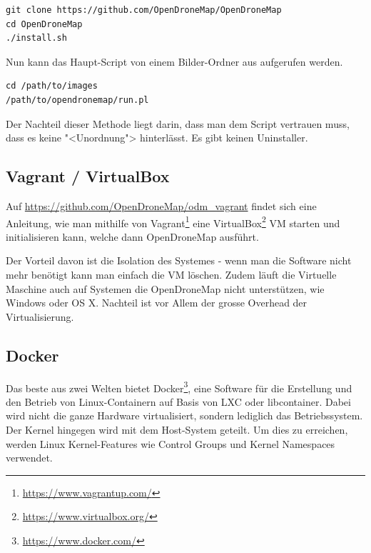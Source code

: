\vspace{0.5\baselineskip}
\begin{verbatim} 
git clone https://github.com/OpenDroneMap/OpenDroneMap
cd OpenDroneMap
./install.sh
\end{verbatim}

\noindent Nun kann das Haupt-Script von einem Bilder-Ordner aus aufgerufen werden.

\vspace{0.5\baselineskip}
\begin{verbatim} 
cd /path/to/images
/path/to/opendronemap/run.pl
\end{verbatim}

\noindent Der Nachteil dieser Methode liegt darin, dass man dem Script vertrauen
muss, dass es keine "<Unordnung"> hinterlässt. Es gibt keinen Uninstaller.

\subsection{Vagrant / VirtualBox}

Auf \url{https://github.com/OpenDroneMap/odm_vagrant} findet sich eine
Anleitung, wie man mithilfe von
Vagrant\footnote{\url{https://www.vagrantup.com/}} eine
VirtualBox\footnote{\url{https://www.virtualbox.org/}} VM starten und
initialisieren kann, welche dann OpenDroneMap ausführt.

Der Vorteil davon ist die Isolation des Systemes - wenn man die Software nicht
mehr benötigt kann man einfach die VM löschen. Zudem läuft die Virtuelle
Maschine auch auf Systemen die OpenDroneMap nicht unterstützen, wie Windows oder
OS X. Nachteil ist vor Allem der grosse Overhead der Virtualisierung.

\subsection{Docker}

Das beste aus zwei Welten bietet Docker\footnote{\url{https://www.docker.com/}},
eine Software für die Erstellung und den Betrieb von Linux-Containern auf Basis
von LXC oder libcontainer. Dabei wird nicht die ganze Hardware virtualisiert,
sondern lediglich das Betriebssystem. Der Kernel hingegen wird mit dem
Host-System geteilt. Um dies zu erreichen, werden Linux Kernel-Features wie
Control Groups und Kernel Namespaces verwendet.

